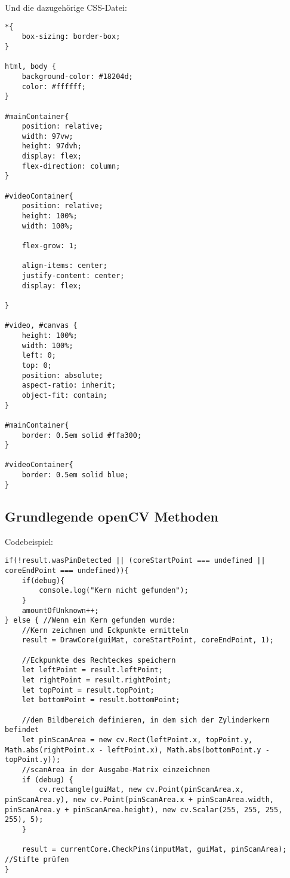 \documentclass{article}
\begin{document}
Und die dazugehörige CSS-Datei:

\begin{lstlisting}[style=CSS]
    *{
    box-sizing: border-box;
}

html, body {
    background-color: #18204d;
    color: #ffffff;
}

#mainContainer{
    position: relative;
    width: 97vw;
    height: 97dvh;
    display: flex;
    flex-direction: column;
}

#videoContainer{
    position: relative;
    height: 100%;
    width: 100%;

    flex-grow: 1;

    align-items: center;
    justify-content: center;
    display: flex;

}

#video, #canvas {
    height: 100%;
    width: 100%;
    left: 0;
    top: 0;
    position: absolute;
    aspect-ratio: inherit;
    object-fit: contain;
}

#mainContainer{
    border: 0.5em solid #ffa300;
}

#videoContainer{
    border: 0.5em solid blue;
}
\end{lstlisting}

\subsection{Grundlegende openCV Methoden}
Codebeispiel:

\begin{lstlisting}[style=JavaScript]
if(!result.wasPinDetected || (coreStartPoint === undefined || coreEndPoint === undefined)){
    if(debug){
        console.log("Kern nicht gefunden");
    }
    amountOfUnknown++;
} else { //Wenn ein Kern gefunden wurde:
    //Kern zeichnen und Eckpunkte ermitteln
    result = DrawCore(guiMat, coreStartPoint, coreEndPoint, 1);

    //Eckpunkte des Rechteckes speichern
    let leftPoint = result.leftPoint;
    let rightPoint = result.rightPoint;
    let topPoint = result.topPoint;
    let bottomPoint = result.bottomPoint;

    //den Bildbereich definieren, in dem sich der Zylinderkern befindet
    let pinScanArea = new cv.Rect(leftPoint.x, topPoint.y, Math.abs(rightPoint.x - leftPoint.x), Math.abs(bottomPoint.y - topPoint.y));
    //scanArea in der Ausgabe-Matrix einzeichnen
    if (debug) {
        cv.rectangle(guiMat, new cv.Point(pinScanArea.x, pinScanArea.y), new cv.Point(pinScanArea.x + pinScanArea.width, pinScanArea.y + pinScanArea.height), new cv.Scalar(255, 255, 255, 255), 5);
    }

    result = currentCore.CheckPins(inputMat, guiMat, pinScanArea); //Stifte prüfen
}
\end{lstlisting}
\end{document}
